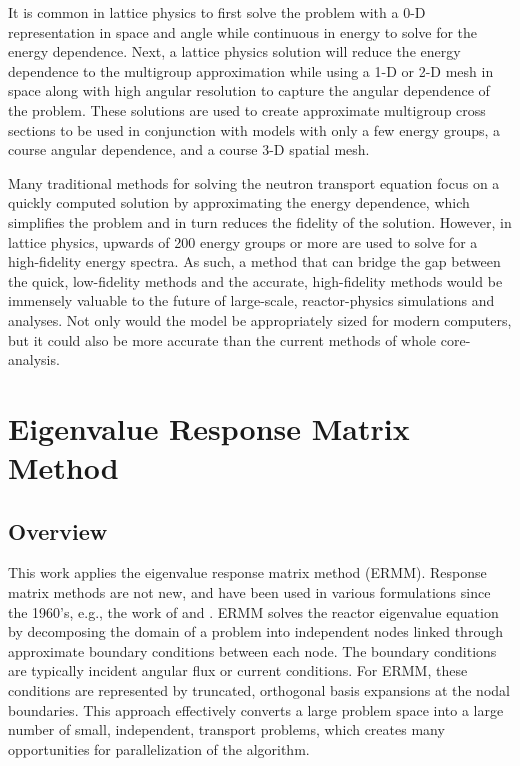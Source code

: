It is common in lattice physics to first solve the problem with a 0-D representation in space 
and angle while continuous in energy to solve for the energy dependence.  Next, a lattice physics 
solution will reduce the energy dependence to the multigroup approximation while using a 1-D or 2-D 
mesh in space along with high angular resolution to capture the angular dependence of the problem. 
These solutions are used to create 
approximate multigroup cross sections to be used in conjunction with models with 
only a few energy groups, a course angular dependence, and a course 3-D spatial mesh. 

Many traditional methods for solving the neutron transport equation focus on a 
quickly computed solution by approximating the energy 
dependence, which simplifies 
the problem and in turn reduces the fidelity of the solution.  However, 
in lattice 
physics, upwards of 200 energy groups or more are used to solve for a 
high-fidelity energy spectra.  As such, a method that can bridge the gap between 
the quick, low-fidelity methods and the accurate, high-fidelity methods 
would be immensely valuable to the future of large-scale, reactor-physics 
simulations and analyses.  Not only would the model be appropriately sized for 
modern computers, but it could also be more accurate than the current methods of 
whole core-analysis.

\section{Eigenvalue Response Matrix Method}

\subsection{Overview}

This work applies the eigenvalue response matrix method (ERMM). Response matrix 
methods are not new, and have been used in various formulations since 
the 1960's, e.g., the work of \citet{shimizu} and \citet{shimizu_et_all}.  ERMM 
solves the reactor eigenvalue equation by decomposing 
the domain of a problem into independent nodes linked through approximate 
boundary conditions between each node.  The boundary conditions are typically 
incident angular flux or current conditions.  For ERMM, these conditions are represented by 
truncated, 
orthogonal basis expansions at the nodal boundaries. This approach 
effectively converts a large problem space into a large number of small, 
independent, transport problems, which creates many opportunities for 
parallelization of the algorithm. 

